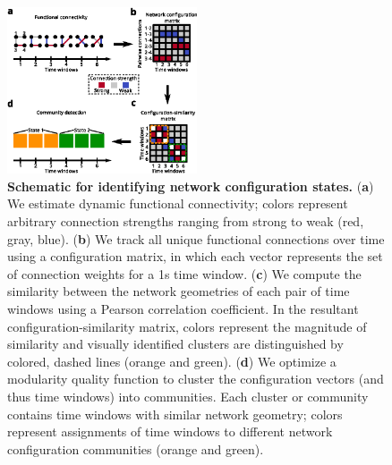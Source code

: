 \begin{figure}[H]
    \centering
\includegraphics[width=0.5\textwidth]{panel2.eps}
\caption[Identifying discrete network states]{\textbf{Schematic for identifying network configuration states.} (\textbf{a}) We estimate dynamic functional connectivity; colors represent arbitrary connection strengths ranging from strong to weak (red, gray, blue). (\textbf{b}) We track all unique functional connections over time using a configuration matrix, in which each vector represents the set of connection weights for a 1s time window. (\textbf{c}) We compute the similarity between the network geometries of each pair of time windows using a Pearson correlation coefficient. In the resultant configuration-similarity matrix, colors represent the magnitude of similarity and visually identified clusters are distinguished by colored, dashed lines (orange and green). (\textbf{d}) We optimize a modularity quality function to cluster the configuration vectors (and thus time windows) into communities. Each cluster or community contains time windows with similar network geometry; colors represent assignments of time windows to different network configuration communities (orange and green). \label{ch3:fig2}}
\end{figure}

